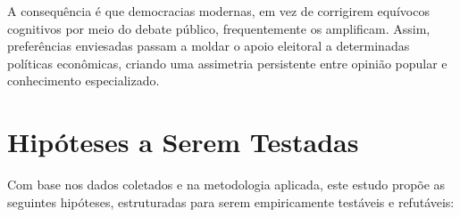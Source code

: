 A consequência é que democracias modernas, em vez de corrigirem equívocos cognitivos por meio do debate público, frequentemente os amplificam. Assim, preferências enviesadas passam a moldar o apoio eleitoral a determinadas políticas econômicas, criando uma assimetria persistente entre opinião popular e conhecimento especializado.


\section{Hipóteses a Serem Testadas}

Com base nos dados coletados e na metodologia aplicada, este estudo propõe as seguintes hipóteses, estruturadas para serem empiricamente testáveis e refutáveis:

